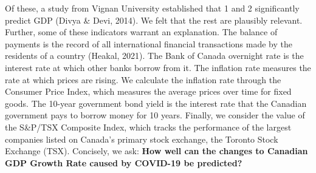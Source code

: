 \documentclass{article}
\begin{document}
Of these, a study from Vignan University established that 1 and 2 significantly predict GDP (Divya & Devi, 2014). We felt that the rest are plausibly relevant. Further, some of these indicators warrant an explanation. The balance of payments is the record of all international financial transactions made by the residents of a country (Heakal, 2021). The Bank of Canada overnight rate is the interest rate at which other banks borrow from it. The inflation rate measures the rate at which prices are rising. We calculate the inflation rate through the Consumer Price Index, which measures the average prices over time for fixed goods. The 10-year government bond yield is the interest rate that the Canadian government pays to borrow money for 10 years. Finally, we consider the value of the S&P/TSX Composite Index, which tracks the performance of the largest companies listed on Canada's primary stock exchange, the Toronto Stock Exchange (TSX). Concisely, we ask: \textbf{How well can the changes to Canadian GDP Growth Rate caused by COVID-19 be predicted?}  
  
  
\end{document}
